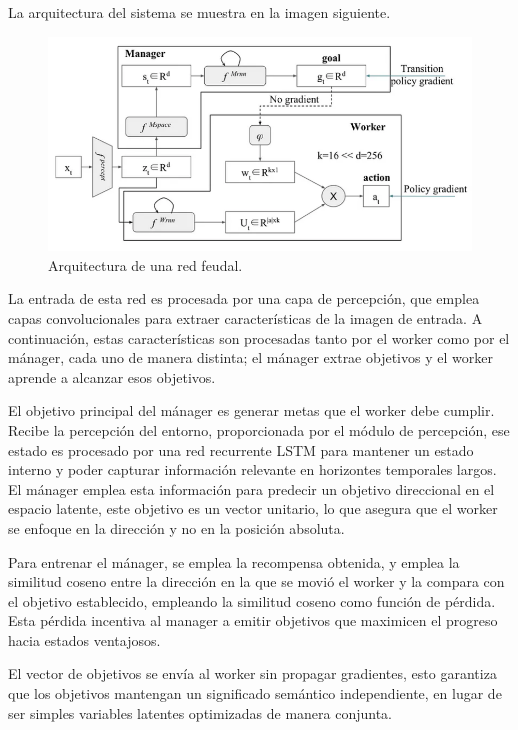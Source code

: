 \documentclass[letterpaper]{article} %
\begin{document}
La arquitectura del sistema se muestra en la imagen siguiente\cite{feudal_networks_2024}.

\begin{figure}[H]
    \centering
    \includegraphics[width=0.9\columnwidth]{feudal_arquitecture.png}
    \caption{Arquitectura de una red feudal.\label{fig:arquitectura_feudal}}
\end{figure}

La entrada de esta red es procesada por una capa de percepción, que emplea capas convolucionales
para extraer características de la imagen de entrada. A continuación, estas características son procesadas
tanto por el worker como por el mánager, cada uno de manera distinta; el mánager extrae objetivos y el worker
aprende a alcanzar esos objetivos.

El objetivo principal del mánager es generar metas que el worker debe cumplir. Recibe la percepción
del entorno, proporcionada por el módulo de percepción, ese estado es procesado por una red recurrente LSTM
para mantener un estado interno y poder capturar información relevante en horizontes temporales largos.
El mánager emplea esta información para predecir un objetivo direccional en el espacio latente, este objetivo
es un vector unitario, lo que asegura que el worker se enfoque en la dirección y no en la posición absoluta.

Para entrenar el mánager, se emplea la recompensa obtenida, y emplea la similitud coseno entre la dirección en la que 
se movió el worker y la compara con el objetivo establecido, empleando la similitud coseno como función de pérdida.
Esta pérdida incentiva al manager a emitir objetivos que maximicen el progreso hacia estados ventajosos.

El vector de objetivos se envía al worker sin propagar gradientes, esto garantiza que los objetivos 
mantengan un significado semántico independiente, en lugar de ser simples variables latentes optimizadas de manera conjunta.
\end{document}

